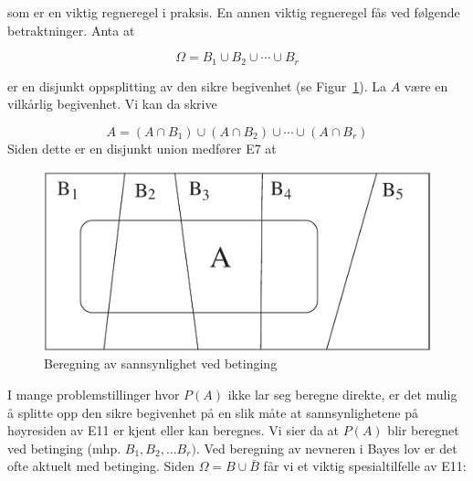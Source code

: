 \begin{center} \framebox[11cm]{\begin{minipage}{10cm}
\[ \mbox{\ \ \ E10. \ \ \ \ } P(B \mid A)=
     \frac{P(B) \cdot P(A \mid B)}{P(A)} \mbox{\bf \ \ \ \ (Bayes lov) }\]
\mbox{}  \end{minipage}} \end{center}

\noindent som er en viktig regneregel i praksis. En annen viktig regneregel
fås ved følgende betraktninger. Anta at

\[ \Omega = B_1 \cup B_2 \cup \cdots \cup B_r \]

\noindent er en disjunkt oppsplitting av den sikre begivenhet (se Figur~\ref{fig:disjunkt_oppspl}).
La $A$ være en vilkårlig begivenhet. Vi kan da skrive

\[  A=(A \cap B_1) \cup (A \cap B_2) \cup \cdots \cup (A \cap B_r) \]
Siden dette er en disjunkt union medfører E7 at

\begin{center}  \end{center}

\begin{figure}[ht]
\centering \centering
 \includegraphics[scale=0.6]{figurer/fig4_1.pdf} 
 \caption{Beregning av sannsynlighet ved betinging}
	\label{fig:disjunkt_oppspl}
\end{figure}
I mange problemstillinger hvor $P(A)$ ikke lar seg beregne
direkte, er det mulig å splitte opp den sikre begivenhet på en
slik måte at sannsynlighetene på høyresiden av E11 er kjent eller
kan beregnes. Vi sier da at $P(A)$ blir beregnet ved betinging
(mhp. $B_1, B_2, \ldots B_r)$. Ved beregning av nevneren i Bayes lov
er det ofte aktuelt med betinging. Siden $\Omega =B\cup \bar{B}$ får vi
et viktig spesialtilfelle av E11:


